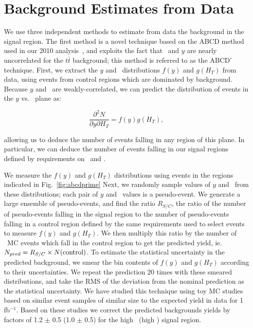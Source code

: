 \section{Background Estimates from Data}
\label{sec:datadriven}
We use three independent methods to estimate from data the background in the signal region.
The first method is a novel technique based on the ABCD method used in our 2010 analysis~\cite{ref:ospaper}, 
and exploits the fact that \HT\ and $y$ are nearly uncorrelated for the $t\bar{t}$ background;
this method is referred to as the ABCD' technique. First, we extract the $y$ and \Ht\ distributions 
$f(y)$ and $g(H_T)$ from data, using events from control regions which are dominated by background. 
Because $y$ and \Ht\ are weakly-correlated, we can predict the distribution of events in the $y$ vs. \Ht\ plane as:

\begin{equation}
\frac{\partial^2 N}{\partial y \partial H_T} = f(y)g(H_T),
\end{equation}

allowing us to deduce the number of events falling in any region of this plane. In particular,
we can deduce the number of events falling in our signal regions defined by requirements on \MET\ and \Ht.

We measure the $f(y)$ and $g(H_T)$ distributions using events in the regions indicated in Fig.~\ref{fig:abcdprime}
Next, we randomly sample values of $y$ and \Ht\ from these distributions; each pair of $y$ and \Ht\ values is a pseudo-event.
We generate a large ensemble of pseudo-events, and find the ratio $R_{S/C}$, the ratio of the
number of pseudo-events falling in the signal region to the number of pseudo-events
falling in a control region defined by the same requirements used to select events
to measure $f(y)$ and $g(H_T)$. We then
multiply this ratio by the number of \ttbar\ MC events which fall in the control region
to get the predicted yield, ie. $N_{pred} = R_{S/C} \times N({\rm control})$. 
To estimate the statistical uncertainty in the predicted background, we smear the bin contents
of $f(y)$ and $g(H_T)$ according to their uncertainties. We repeat the prediction 20 times
with these smeared distributions, and take the RMS of the deviation from the nominal prediction
as the statistical uncertainty. We have studied this technique using toy MC studies based on
similar event samples of similar size to the expected yield in data for 1 fb$^{-1}$.
Based on these studies we correct the predicted backgrounds yields by factors of 1.2 $\pm$ 0.5
(1.0 $\pm$ 0.5) for the high \MET\ (high \Ht) signal region.


